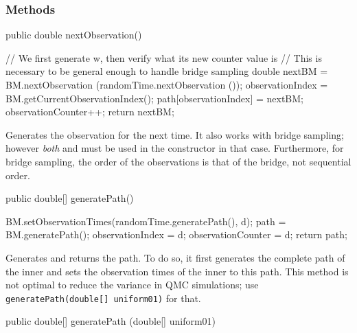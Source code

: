 \subsubsection* {Methods}
\begin{code}

   public double nextObservation()\begin{hide} {
        // We first generate w, then verify what its new counter value is
        // This is necessary to be general enough to handle bridge sampling
        double nextBM = BM.nextObservation (randomTime.nextObservation ());
        observationIndex = BM.getCurrentObservationIndex();
        path[observationIndex] = nextBM;
        observationCounter++;
        return nextBM;
    }\end{hide}
\end{code}
\begin{tabb} Generates the observation for the next time.
It also works with bridge sampling; however \emph{both}
 and 
must be used in the constructor in that case.  Furthermore, for bridge
sampling, the order of the observations is that of the bridge,
not sequential order.
\end{tabb}
\begin{code}

   public double[] generatePath() \begin{hide} {
        BM.setObservationTimes(randomTime.generatePath(), d);
        path = BM.generatePath();
        observationIndex = d;
        observationCounter = d;
        return path;
    }\end{hide}
\end{code}
\begin{tabb} Generates and returns the path. To do so, it
first generates the complete path of the inner 
and sets the observation times of the inner 
to this path.  This method is not optimal to reduce the variance in
QMC simulations; use \texttt{generatePath(double[] uniform01)} for that.
\end{tabb}
\begin{code}

   public double[] generatePath (double[] uniform01) 
\end{code}
